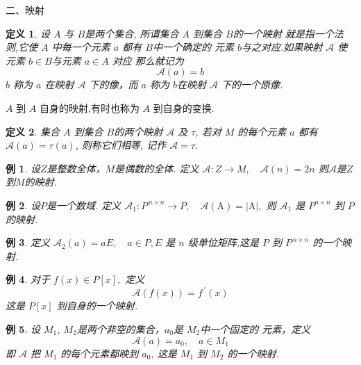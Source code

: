 \documentclass[13pt]{beamer}
\newtheorem{exa}{例}
\newtheorem*{defi}{定义}
\def\A{\mathscr{A}}
\begin{document}
\begin{frame}{二、映射}
\begin{defi}
设 $A$ 与 $B$是两个集合, 所谓集合 $A$ 到集合 $B$的一个映射 就是指一个法则,它使 $A$ 中每一个元素 $a$ 都有 $B$中一个确定的 元素 $b$与之对应.如果映射 $\A$ 使元素 $b \in  B$与元素 $a \in A$ 对应 那么就记为
\[
\A(a)=b
\]
$b$ 称为 $a$ 在映射 $\A$ 下的像，而 $a$ 称为 $b$在映射 $\A$ 下的一个原像.	
\end{defi}


$A$ 到 $A$ 自身的映射,有时也称为 $A$ 到自身的变换. 
\begin{defi}
集合 $A$ 到集合 $B$的两个映射 $\A$ 及 $\tau$, 若对 $M$ 的每个元素 $a$ 都有 
$\A(a)=\tau(a)$, 则称它们相等, 记作 $\A=\tau.$
\end{defi}
\end{frame}



\begin{frame}
\small{
\begin{exa}
设$Z$是整数全体，$M$是偶数的全体. 定义
$
\A: Z \rightarrow M, \quad \A(n)=2 n
$
则$\A$是$Z$到$M$的映射. 
\end{exa}

\begin{exa}
	设$P$是一个数域. 定义
$\A_1: {P}^{\, n \times n} \rightarrow {P}, \quad \A(\mathrm{A})=|\mathrm{A}|,$
则 $\A_1$ 是 ${P}^{{n} \times {n}}$ 到 $P$ 的映射.
\end{exa}

\begin{exa}
定义
$
\A_{2}(a)=a {E}, \quad a \in P, {E}$ 是 $n$ 级单位矩阵,这是 $P$ 到 ${P}^{\, n \times n}$ 的一个映射.
\end{exa}
}
\end{frame}


\begin{frame}
\begin{exa}
对于 $f(x) \in P[x],$ 定义
\[
\A(f(x))=f^{\,\prime}(x)
\]
这是 $P[x]$ 到自身的一个映射. 
\end{exa}

\begin{exa}
设 $M_1$, $M_2$是两个非空的集合，$a_0$是 $M_2$中一个固定的
元素，定义
\[
\A(a)=a_{0}, \quad a \in M_1
\]
即 $\A$ 把 $M_1$ 的每个元素都映到 $a_{0}$, 这是 $M_1$ 到 $M_2$ 的一个映射. 	
\end{exa}
\end{frame}
\end{document}
